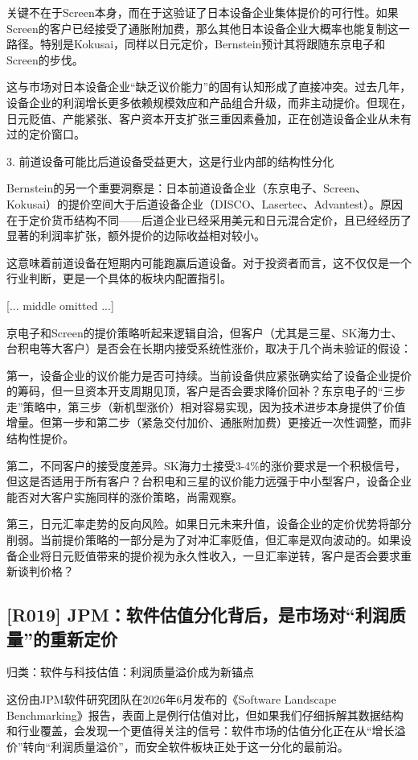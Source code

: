 \documentclass[11pt]{ctexart}
\begin{document}
关键不在于Screen本身，而在于这验证了日本设备企业集体提价的可行性。如果Screen的客户已经接受了通胀附加费，那么其他日本设备企业大概率也能复制这一路径。特别是Kokusai，同样以日元定价，Bernstein预计其将跟随东京电子和Screen的步伐。

这与市场对日本设备企业“缺乏议价能力”的固有认知形成了直接冲突。过去几年，设备企业的利润增长更多依赖规模效应和产品组合升级，而非主动提价。但现在，日元贬值、产能紧张、客户资本开支扩张三重因素叠加，正在创造设备企业从未有过的定价窗口。

3. 前道设备可能比后道设备受益更大，这是行业内部的结构性分化

Bernstein的另一个重要洞察是：日本前道设备企业（东京电子、Screen、Kokusai）的提价空间大于后道设备企业（DISCO、Lasertec、Advantest）。原因在于定价货币结构不同——后道企业已经采用美元和日元混合定价，且已经经历了显著的利润率扩张，额外提价的边际收益相对较小。

这意味着前道设备在短期内可能跑赢后道设备。对于投资者而言，这不仅仅是一个行业判断，更是一个具体的板块内配置指引。


[... middle omitted ...]

京电子和Screen的提价策略听起来逻辑自洽，但客户（尤其是三星、SK海力士、台积电等大客户）是否会在长期内接受系统性涨价，取决于几个尚未验证的假设：

第一，设备企业的议价能力是否可持续。当前设备供应紧张确实给了设备企业提价的筹码，但一旦资本开支周期见顶，客户是否会要求降价回补？东京电子的“三步走”策略中，第三步（新机型涨价）相对容易实现，因为技术进步本身提供了价值增量。但第一步和第二步（紧急交付加价、通胀附加费）更接近一次性调整，而非结构性提价。

第二，不同客户的接受度差异。SK海力士接受3-4\%的涨价要求是一个积极信号，但这是否适用于所有客户？台积电和三星的议价能力远强于中小型客户，设备企业能否对大客户实施同样的涨价策略，尚需观察。

第三，日元汇率走势的反向风险。如果日元未来升值，设备企业的定价优势将部分削弱。当前提价策略的一部分是为了对冲汇率贬值，但汇率是双向波动的。如果设备企业将日元贬值带来的提价视为永久性收入，一旦汇率逆转，客户是否会要求重新谈判价格？

\subsection{[R019] JPM：软件估值分化背后，是市场对“利润质量”的重新定价}
{\small\color{refgray}归类：软件与科技估值：利润质量溢价成为新锚点}

这份由JPM软件研究团队在2026年6月发布的《Software Landscape Benchmarking》报告，表面上是例行估值对比，但如果我们仔细拆解其数据结构和行业覆盖，会发现一个更值得关注的信号：软件市场的估值分化正在从“增长溢价”转向“利润质量溢价”，而安全软件板块正处于这一分化的最前沿。
\end{document}
